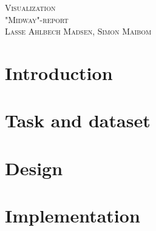 \documentclass{article}
\begin{document}
\begin{center}
\textsc{\Large Visualization}\\[0.5cm]
\textsc{\large "Midway"-report}\\[0.5cm]
\textsc{\large Lasse Ahlbech Madsen, Simon Maibom}\\[0.5cm]
\vspace{1 cm}
\end{center}

\section{Introduction}


\section{Task and dataset}


\section{Design}


\section{Implementation}
\end{document}
